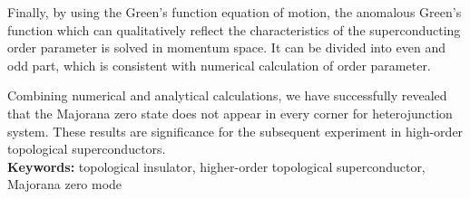 Finally, by using the Green's function equation of motion, the anomalous Green's function which can qualitatively reflect the characteristics of the superconducting order parameter is solved in momentum space. It can be divided into even and odd part, which is consistent with numerical calculation of order parameter. 

Combining numerical and analytical calculations, we have successfully revealed that the Majorana zero state does not appear in every corner for  heterojunction system. These results are significance for the subsequent experiment in high-order topological superconductors.
 \\
 
\noindent\textbf{ Keywords:} topological insulator, higher-order topological superconductor, Majorana zero mode